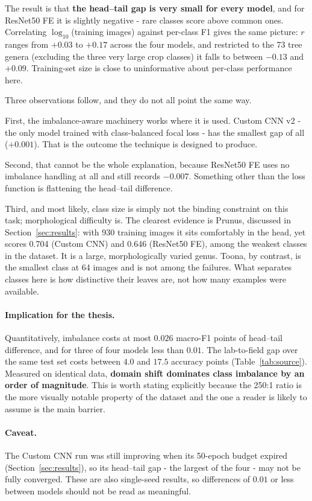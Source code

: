 \documentclass[12pt,a4paper]{article}
\begin{document}
The result is that \textbf{the head--tail gap is very small for every model}, and for ResNet50 FE it is slightly negative - rare classes score above common ones. Correlating $\log_{10}$(training images) against per-class F1 gives the same picture: $r$ ranges from $+0.03$ to $+0.17$ across the four models, and restricted to the 73 tree genera (excluding the three very large crop classes) it falls to between $-0.13$ and $+0.09$. Training-set size is close to uninformative about per-class performance here.

Three observations follow, and they do not all point the same way.

First, the imbalance-aware machinery works where it is used. Custom CNN v2 - the only model trained with class-balanced focal loss - has the smallest gap of all ($+0.001$). That is the outcome the technique is designed to produce.

Second, that cannot be the whole explanation, because ResNet50 FE uses no imbalance handling at all and still records $-0.007$. Something other than the loss function is flattening the head--tail difference.

Third, and most likely, class size is simply not the binding constraint on this task; morphological difficulty is. The clearest evidence is Prunus, discussed in Section~\ref{sec:results}: with 930 training images it sits comfortably in the head, yet scores 0.704 (Custom CNN) and 0.646 (ResNet50 FE), among the weakest classes in the dataset. It is a large, morphologically varied genus. Toona, by contrast, is the smallest class at 64 images and is not among the failures. What separates classes here is how distinctive their leaves are, not how many examples were available.

\paragraph{Implication for the thesis.} Quantitatively, imbalance costs at most $0.026$ macro-F1 points of head--tail difference, and for three of four models less than $0.01$. The lab-to-field gap over the same test set costs between $4.0$ and $17.5$ accuracy points (Table~\ref{tab:source}). Measured on identical data, \textbf{domain shift dominates class imbalance by an order of magnitude}. This is worth stating explicitly because the 250:1 ratio is the more visually notable property of the dataset and the one a reader is likely to assume is the main barrier.

\paragraph{Caveat.} The Custom CNN run was still improving when its 50-epoch budget expired (Section~\ref{sec:results}), so its head--tail gap - the largest of the four - may not be fully converged. These are also single-seed results, so differences of $0.01$ or less between models should not be read as meaningful.
\end{document}
